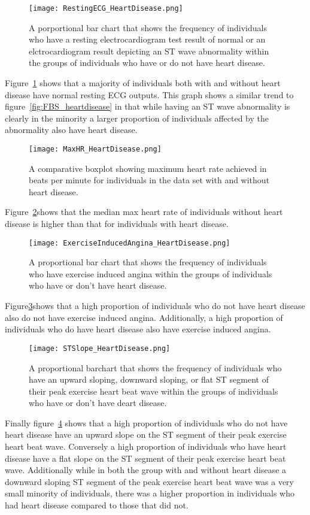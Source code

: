 \documentclass[12pt]{article}
\begin{document}
\begin{figure}[tbp]
  \centering
  \texttt{[image: RestingECG\_HeartDisease.png]}
  \caption{A porportional bar chart that shows the frequency of individuals who have a resting electrocardiogram test result of normal or an elctrocardiogram result depicting an ST wave abnormality within the groups of individuals who have or do not have heart disease.}
  \label{fig:ECG_heartdisease}
\end{figure}
Figure~\ref{fig:ECG_heartdisease} shows that a majority of individuals both with and without heart disease have normal resting ECG outputs. This graph shows a similar trend to figure~\ref{fig:FBS_heartdisease} in that while having an ST wave abnormality is clearly in the minority a larger proportion of individuals affected by the abnormality also have heart disease.
\begin{figure}[tbp]
  \centering
  \texttt{[image: MaxHR\_HeartDisease.png]}
  \caption{A comparative boxplot showing maximum heart rate achieved in beats per minute for individuals in the data set with and without heart disease.}
  \label{fig:maxHR_heartdisease}
\end{figure}
Figure~\ref{fig:maxHR_heartdisease}shows that the median max heart rate of individuals without heart disease is higher than that for individuals with heart disease. 
\begin{figure}[tbp]
  \centering
  \texttt{[image: ExerciseInducedAngina\_HeartDisease.png]}
  \caption{A proportional bar chart that shows the frequency of individuals who have exercise induced angina within the groups of individuals who have or don't have heart disease.}
  \label{fig:EIA_heartdisease}
\end{figure}
Figure\ref{fig:EIA_heartdisease}shows that a high proportion of individuals who do not have heart disease also do not have exercise induced angina. Additionally, a high proportion of individuals who do have heart disease also have exercise induced angina. 
\begin{figure}[tbp]
  \centering
  \texttt{[image: STSlope\_HeartDisease.png]}
  \caption{A proportional barchart that shows the frequency of individuals who have an upward sloping, downward sloping, or flat ST segment of their peak exercise heart beat wave within the groups of individuals who have or don't have deart disease.}
  \label{fig:STslope_heartdisease}
\end{figure}
Finally figure~\ref{fig:STslope_heartdisease} shows that a high proportion of individuals who do not have heart disease have an upward slope on the ST segment of their peak exercise heart beat wave. Conversely a high proportion of individuals who have heart disease have a flat slope on the ST segment of their peak exercise heart beat wave. Additionally while in both the group with and without heart disease a downward sloping ST segment of the peak exercise heart beat wave was a very small minority of individuals, there was a higher proportion in individuals who had heart disease compared to those that did not.
\end{document}

